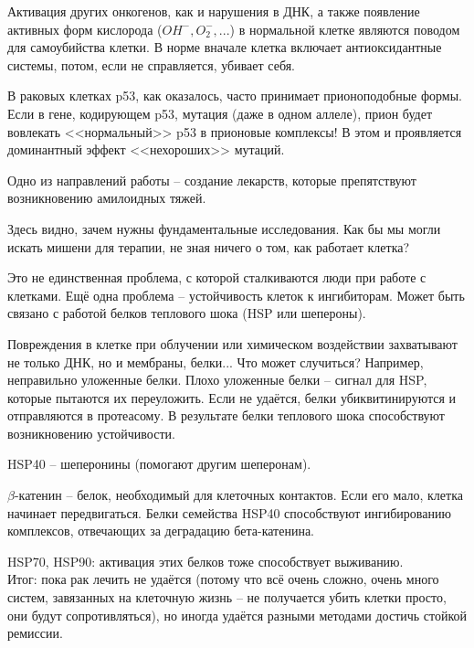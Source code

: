 \documentclass[main.tex]{subfiles}
\begin{document}
Активация других онкогенов, как и нарушения в ДНК, а также появление активных форм кислорода ($ OH^-, O_2^-, ... $) в нормальной клетке являются поводом для самоубийства клетки.
В норме вначале клетка включает антиоксидантные системы, потом, если не справляется, убивает себя.

В раковых клетках p53, как оказалось, часто принимает прионоподобные формы.
Если в гене, кодирующем p53, мутация (даже в одном аллеле), прион будет вовлекать <<нормальный>> p53 в прионовые комплексы!
В этом и проявляется доминантный эффект <<нехороших>> мутаций.

Одно из направлений работы -- создание лекарств, которые препятствуют возникновению амилоидных тяжей.

\begin{leftbar}
Здесь видно, зачем нужны фундаментальные исследования.
Как бы мы могли искать мишени для терапии, не зная ничего о том, как работает клетка?
\end{leftbar}

Это не единственная проблема, с которой сталкиваются люди при работе с клетками.
Ещё одна проблема -- устойчивость клеток к ингибиторам.
Может быть связано с работой белков теплового шока (HSP или шепероны).

Повреждения в клетке при облучении или химическом воздействии захватывают не только ДНК, но и мембраны, белки...
Что может случиться?
Например, неправильно уложенные белки.
Плохо уложенные белки -- сигнал для HSP, которые пытаются их переуложить.
Если не удаётся, белки убиквитинируются и отправляются в протеасому.
В результате белки теплового шока способствуют возникновению устойчивости.

HSP40 -- шеперонины (помогают другим шеперонам).

$ \beta $-катенин -- белок, необходимый для клеточных контактов.
Если его мало, клетка начинает передвигаться.
Белки семейства HSP40 способствуют ингибированию комплексов, отвечающих за деградацию бета-катенина.

HSP70, HSP90: активация этих белков тоже способствует выживанию. \\

Итог: пока рак лечить не удаётся (потому что всё очень сложно, очень много систем, завязанных на клеточную жизнь -- не получается убить клетки просто, они будут сопротивляться), но иногда удаётся разными методами достичь стойкой ремиссии.
\end{document}
